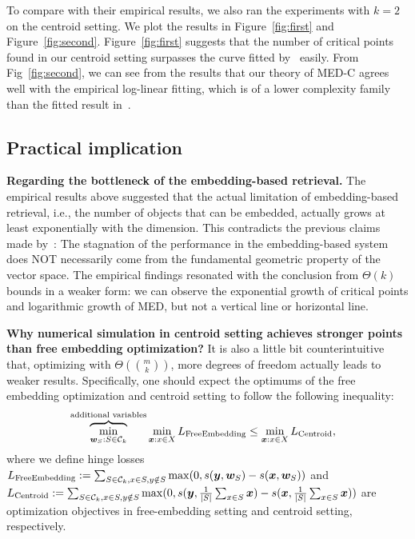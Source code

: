 \documentclass[10pt]{article}
\begin{document}
To compare with their empirical results, we also ran the experiments with $k=2$ on the centroid setting. We plot the results in Figure~\ref{fig:first} and Figure~\ref{fig:second}. Figure~\ref{fig:first} suggests that the number of critical points found in our centroid setting surpasses the curve fitted by~\cite{weller2025theoretical} easily. From Fig~\ref{fig:second}, we can see from the results that our theory of MED-C agrees well with the empirical log-linear fitting, which is of a lower complexity family than the fitted result in~\cite{weller2025theoretical}.



\subsection{Practical implication}

\noindent\textbf{Regarding the bottleneck of the embedding-based retrieval.} The empirical results above suggested that the actual limitation of embedding-based retrieval, i.e., the number of objects that can be embedded, actually grows at least exponentially with the dimension. This contradicts the previous claims made by~\cite{weller2025theoretical}: The stagnation of the performance in the embedding-based system does NOT necessarily come from the fundamental geometric property of the vector space. The empirical findings resonated with the conclusion from $\Theta(k)$ bounds in a weaker form: we can observe the exponential growth of critical points and logarithmic growth of MED, but not a vertical line or horizontal line.

\noindent\textbf{Why numerical simulation in centroid setting achieves stronger points than free embedding optimization?}
It is also a little bit counterintuitive that, optimizing with $\Theta(\binom{m}{k})$, more degrees of freedom actually leads to weaker results. Specifically, one should expect the optimums of the free embedding optimization and centroid setting to follow the following inequality:
\begin{align*}
    &\overbrace{\min_{\bm{w}_S: S\in \mathcal{C}_k}}^{\text{additional variables}} \min_{\bm{x}: x\in X}  L_{\rm Free Embedding} \leq \min_{\bm{x}: x\in X} L_{\rm Centroid},
\end{align*}
where we define hinge losses $L_{\rm Free Embedding} := \sum_{S \in \mathcal{C}_k,x\in S,y\notin S}\max(0, s(\bm{y}, \bm{w}_S) - s(\bm{x}, \bm{w}_S))$ and $L_{\rm Centroid} :=  \sum_{S \in \mathcal{C}_k,x\in S,y\notin S}\max(0, s(\bm{y}, \frac{1}{|S|}\sum_{x\in S} \bm{x}) - s(\bm{x}, \frac{1}{|S|}\sum_{x\in S} \bm{x}))$ are optimization objectives in free-embedding setting and centroid setting, respectively.
\end{document}
